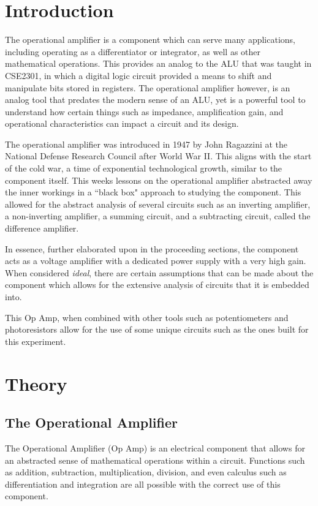 \documentclass[12pt]{article}
\begin{document}
\section{Introduction}
The operational amplifier is a component which can serve many applications,
including operating as a differentiator or integrator, as well as other
mathematical operations. This provides an analog to the ALU that was taught in
CSE2301, in which a digital logic circuit provided a means to shift and
manipulate bits stored in registers. The operational amplifier however, is an
analog tool that predates the modern sense of an ALU, yet is a powerful tool to
understand how certain things such as impedance, amplification gain, and
operational characteristics can impact a circuit and its design.

The operational amplifier was introduced in 1947 by John Ragazzini at the
National Defense Research Council after World War II. This aligns with the start
of the cold war, a time of exponential technological growth, similar to the
component itself. This weeks lessons on the operational amplifier abstracted away the inner
workings in a ``black box" approach to studying the component. This allowed for
the abstract analysis of several circuits such as an inverting amplifier, a
non-inverting amplifier, a summing circuit, and a subtracting circuit, called
the  difference amplifier.

In essence, further elaborated upon in the proceeding sections, the component
acts as a voltage amplifier with a dedicated power supply with a very high gain.
When considered \textit{ideal}, there are certain assumptions that can be made
about the component which allows for the extensive analysis of circuits that it
is embedded into.

This Op Amp, when combined with other tools such as potentiometers and
photoresistors allow for the use of some unique circuits such as the ones built
for this experiment.

\section{Theory}

\subsection{The Operational Amplifier}
The Operational Amplifier (Op Amp) is an electrical component that allows for an
abstracted sense of mathematical operations within a circuit. Functions such as
addition, subtraction, multiplication, division, and even calculus such as
differentiation and integration are all possible with the correct use of this
component.
\end{document}
